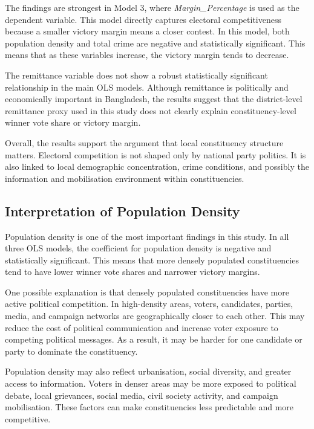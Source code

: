 \documentclass[12pt,a4paper]{article}
\begin{document}
The findings are strongest in Model 3, where \textit{Margin\_Percentage} is used as the dependent variable. This model directly captures electoral competitiveness because a smaller victory margin means a closer contest. In this model, both population density and total crime are negative and statistically significant. This means that as these variables increase, the victory margin tends to decrease.

The remittance variable does not show a robust statistically significant relationship in the main OLS models. Although remittance is politically and economically important in Bangladesh, the results suggest that the district-level remittance proxy used in this study does not clearly explain constituency-level winner vote share or victory margin.

Overall, the results support the argument that local constituency structure matters. Electoral competition is not shaped only by national party politics. It is also linked to local demographic concentration, crime conditions, and possibly the information and mobilisation environment within constituencies.

\subsection{Interpretation of Population Density}

Population density is one of the most important findings in this study. In all three OLS models, the coefficient for population density is negative and statistically significant. This means that more densely populated constituencies tend to have lower winner vote shares and narrower victory margins.

One possible explanation is that densely populated constituencies have more active political competition. In high-density areas, voters, candidates, parties, media, and campaign networks are geographically closer to each other. This may reduce the cost of political communication and increase voter exposure to competing political messages. As a result, it may be harder for one candidate or party to dominate the constituency.

Population density may also reflect urbanisation, social diversity, and greater access to information. Voters in denser areas may be more exposed to political debate, local grievances, social media, civil society activity, and campaign mobilisation. These factors can make constituencies less predictable and more competitive.
\end{document}

